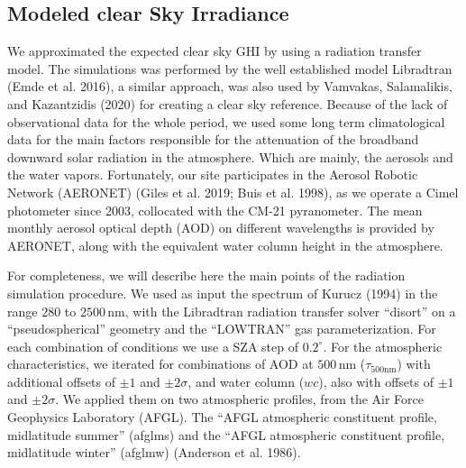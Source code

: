 \documentclass[
  preprint, 3p, authoryear]{article}
\begin{document}
\hypertarget{modeled-clear-sky-irradiance}{%
\subsection{Modeled clear Sky Irradiance}\label{modeled-clear-sky-irradiance}}

We approximated the expected clear sky GHI by using a radiation transfer model. The
simulations was performed by the well established model Libradtran (Emde et al. 2016), a
similar approach, was also used by Vamvakas, Salamalikis, and Kazantzidis (2020) for creating a clear sky reference.
Because of the lack of observational data for the whole period, we used some long
term climatological data for the main factors responsible for the attenuation of the
broadband downward solar radiation in the atmosphere. Which are mainly, the aerosols
and the water vapors. Fortunately, our site participates in the Aerosol Robotic
Network (AERONET) (Giles et al. 2019; Buis et al. 1998), as we operate a Cimel photometer since
2003, collocated with the CM-21 pyranometer. The mean monthly aerosol optical depth
(AOD) on different wavelengths is provided by AERONET, along with the equivalent
water column height in the atmosphere.

For completeness, we will describe here the main points of the radiation simulation
procedure. We used as input the spectrum of Kurucz (1994) in the range \(280\) to
\(2500\,\text{nm}\), with the Libradtran radiation transfer solver ``disort'' on a
``pseudospherical'' geometry and the ``LOWTRAN'' gas parameterization. For each
combination of conditions we use a SZA step of \(0.2^\circ\).
For the atmospheric characteristics, we iterated for combinations of AOD at
\(500\,\text{nm}\) (\(\tau_{500\text{nm}}\)) with additional offsets of \(\pm1\) and
\(\pm2\sigma\), and water column (\(wc\)), also with offsets of \(\pm1\) and \(\pm2\sigma\).
We applied them on two atmospheric profiles, from the Air Force Geophysics
Laboratory (AFGL). The ``AFGL atmospheric constituent profile, midlatitude summer''
(afglms) and the ``AFGL atmospheric constituent profile, midlatitude winter'' (afglmw)
(Anderson et al. 1986).
\end{document}
